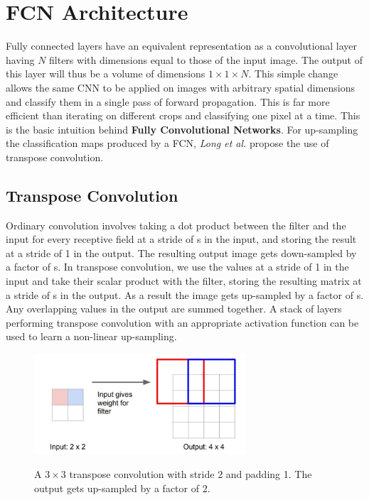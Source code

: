 \documentclass[12pt, a4paper]{report}
\begin{document}
\section{FCN Architecture}
Fully connected layers have an equivalent representation as a convolutional layer having $N$ filters with dimensions equal to those of the input image. The output of this layer will thus be a volume of dimensions $1 \times 1 \times N$. This simple change allows the same CNN to be applied on images with arbitrary spatial dimensions and classify them in a single pass of forward propagation. This is far more efficient than iterating on different crops and classifying one pixel at a time. This is the basic intuition behind \textbf{Fully Convolutional Networks}.\cite{long2015fully} For up-sampling the classification maps produced by a FCN, \textit{Long et al.}\cite{long2015fully} propose the use of transpose convolution. 
\subsection{Transpose Convolution}
Ordinary convolution involves taking a dot product between the filter and the input for every receptive field at a stride of s in the input, and storing the result at a stride of 1 in the output. The resulting output image gets down-sampled by a factor of s. In transpose convolution, we use the values at a stride of 1 in the input and take their scalar product with the filter, storing the resulting matrix at a stride of s in the output. As a result the image gets up-sampled by a factor of s. Any overlapping values in the output are summed together.\cite{long2015fully, cs231n}
A stack of layers performing transpose convolution with an appropriate activation function can be used to learn a non-linear up-sampling.\cite{long2015fully}\begin{figure}[h]
\centering
\includegraphics[width=0.7\textwidth]{fcn.jpg}
\caption{A $3 \times 3$ transpose convolution with stride 2 and padding 1. The output gets up-sampled by a factor of 2.}
\cite{cs231n}
\end{figure}
\end{document}
